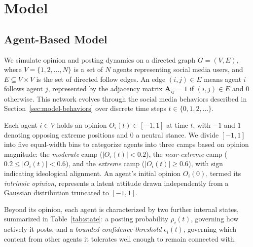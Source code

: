 \documentclass{svproc}
\def\post{\rho}                 %
\def\BoundedConfidence{\epsilon} %
\def\Stubbornness{\mu}           %
\begin{document}
\section{Model}\label{sec:model}
\subsection{Agent-Based Model}\label{sec:model-abm}
We simulate opinion and posting dynamics on a directed graph
$G=(V,E)$, where $V=\{1,2,\dots,N\}$ is a set of $N$ agents
representing social media users, and $E\subseteq V\times V$ is the set
of directed follow edges. An edge $(i,j)\in E$ means agent $i$ follows
agent $j$, represented by the adjacency matrix $\mathbf{A}_{ij}=1$ if
$(i,j)\in E$ and $0$ otherwise. This network evolves through the
social media behaviors described in Section~\ref{sec:model-behaviors}
over discrete time steps $t\in\{0,1,2,\dots\}$.
\par


Each agent $i\in V$ holds an opinion $O_i(t)\in[-1,1]$ at time $t$,
with $-1$ and $1$ denoting opposing extreme positions and $0$ a
neutral stance. We divide $[-1,1]$ into five equal-width bins to
categorize agents into three camps based on opinion magnitude: the
\emph{moderate} camp ($\vert O_i(t)\vert <0.2$), the
\emph{near-extreme} camp ($0.2\le\vert O_i(t)\vert<0.6$), and the
\emph{extreme} camp ($\vert O_i(t)\vert\ge0.6$), with sign indicating
ideological alignment. An agent's initial opinion $O_i(0)$, termed its
\emph{intrinsic opinion}, represents a latent attitude drawn
independently from a Gaussian distribution truncated to $[-1,1]$.
\par


Beyond its opinion, each agent is characterized by two further
internal states, summarized in Table~\ref{tab:state}: a posting
probability $\post_i(t)$, governing how actively it posts, and a
\emph{bounded-confidence threshold} $\BoundedConfidence_i(t)$,
governing which content from other agents it tolerates well enough to
remain connected with.
\par

\end{document}
